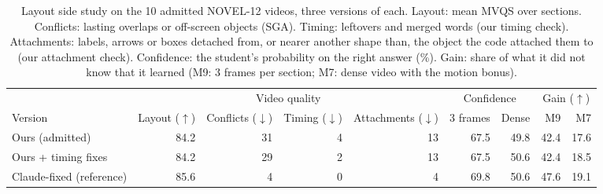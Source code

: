 \begin{table}[t]\centering\small
\caption{Layout side study on the 10 admitted NOVEL-12 videos, three versions of each. Layout: mean MVQS over sections. Conflicts: lasting overlaps or off-screen objects (SGA). Timing: leftovers and merged words (our timing check). Attachments: labels, arrows or boxes detached from, or nearer another shape than, the object the code attached them to (our attachment check). Confidence: the student's probability on the right answer (\%). Gain: share of what it did not know that it learned (M9: 3 frames per section; M7: dense video with the motion bonus).}\label{tab:layout_study}
\begin{tabular}{lrrrrrrrr}\toprule & \multicolumn{4}{c}{Video quality} & \multicolumn{2}{c}{Confidence} & \multicolumn{2}{c}{Gain ($\uparrow$)}\\
\cmidrule(lr){2-5}\cmidrule(lr){6-7}\cmidrule(lr){8-9}
Version & Layout ($\uparrow$) & Conflicts ($\downarrow$) & Timing ($\downarrow$) & Attachments ($\downarrow$) & 3 frames & Dense & M9 & M7\\\midrule
Ours (admitted) & 84.2 & 31 & 4 & 13 & 67.5 & 49.8 & 42.4 & 17.6 \\
Ours + timing fixes & 84.2 & 29 & 2 & 13 & 67.5 & 50.6 & 42.4 & 18.5 \\
Claude-fixed (reference) & 85.6 & 4 & 0 & 4 & 69.8 & 50.6 & 47.6 & 19.1 \\
\bottomrule\end{tabular}
\end{table}
